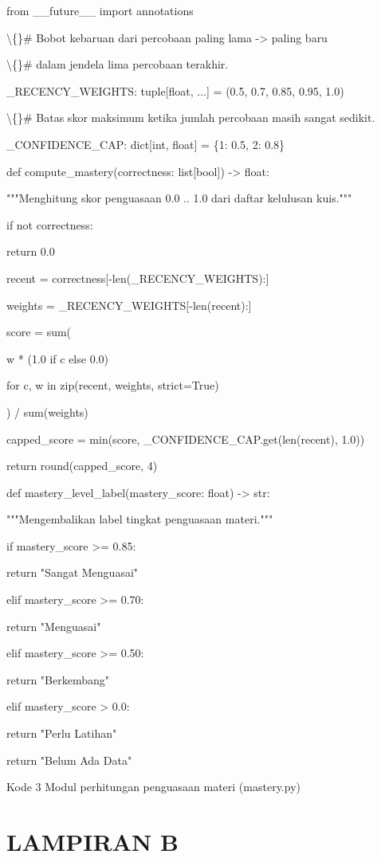 \documentclass[12pt,a4paper]{article}
\begin{document}
from \_\_future\_\_ import annotations

\textbackslash\{\}\# Bobot kebaruan dari percobaan paling lama -\textgreater{} paling baru

\textbackslash\{\}\# dalam jendela lima percobaan terakhir.

\_RECENCY\_WEIGHTS: tuple{[}float, ...{]} = (0.5, 0.7, 0.85, 0.95, 1.0)

\textbackslash\{\}\# Batas skor maksimum ketika jumlah percobaan masih sangat sedikit.

\_CONFIDENCE\_CAP: dict{[}int, float{]} = \{1: 0.5, 2: 0.8\}

def compute\_mastery(correctness: list{[}bool{]}) -\textgreater{} float:

"""Menghitung skor penguasaan 0.0 .. 1.0 dari daftar kelulusan kuis."""

if not correctness:

return 0.0

recent = correctness{[}-len(\_RECENCY\_WEIGHTS):{]}

weights = \_RECENCY\_WEIGHTS{[}-len(recent):{]}

score = sum(

w * (1.0 if c else 0.0)

for c, w in zip(recent, weights, strict=True)

) / sum(weights)

capped\_score = min(score, \_CONFIDENCE\_CAP.get(len(recent), 1.0))

return round(capped\_score, 4)

def mastery\_level\_label(mastery\_score: float) -\textgreater{} str:

"""Mengembalikan label tingkat penguasaan materi."""

if mastery\_score \textgreater{}= 0.85:

return "Sangat Menguasai"

elif mastery\_score \textgreater{}= 0.70:

return "Menguasai"

elif mastery\_score \textgreater{}= 0.50:

return "Berkembang"

elif mastery\_score \textgreater{} 0.0:

return "Perlu Latihan"

return "Belum Ada Data"

Kode 3	Modul perhitungan penguasaan materi (mastery.py)

\section*{LAMPIRAN B}
\end{document}
